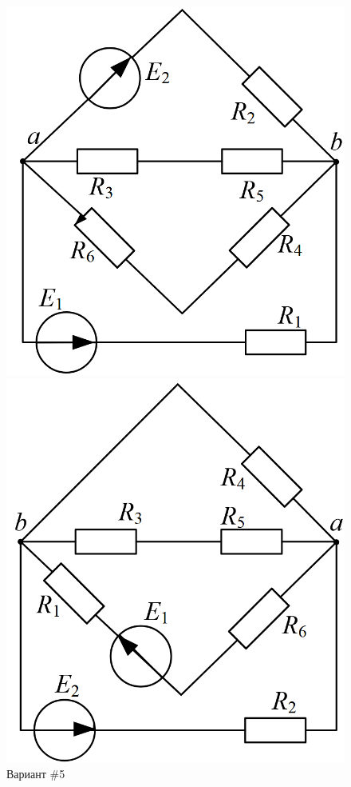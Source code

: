 \begin{figure}[H]
    \centering
    \begin{minipage}{0.48\textwidth}
        \centering
        \includegraphics[width=\textwidth]{images/5_task.png}
        \caption{Вариант \#5}
        \label{fig:task_5}
    \end{minipage}
    \hfill
    \begin{minipage}{0.48\textwidth}
        \centering
        \includegraphics[width=\textwidth]{images/6_task.png}

\end{minipage}
\end{figure}
